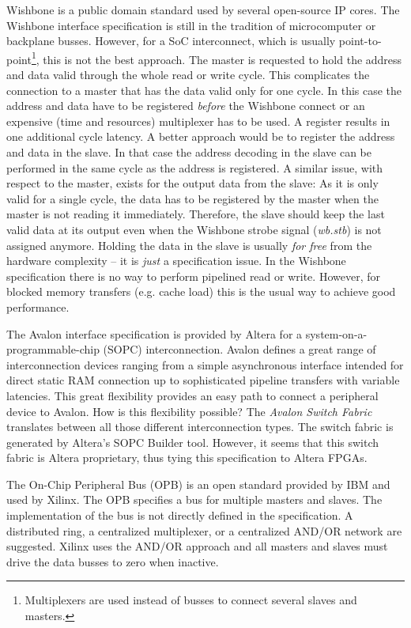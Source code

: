 Wishbone \cite{soc:wishbone} is a public domain standard used by
several open-source IP cores. The Wishbone interface specification is
still in the tradition of microcomputer or backplane busses. However,
for a SoC interconnect, which is usually
point-to-point\footnote{Multiplexers are used instead of busses to
connect several slaves and masters.}, this is not the best approach.
The master is requested to hold the address and data valid through
the whole read or write cycle. This complicates the connection to a
master that has the data valid only for one cycle. In this case the
address and data have to be registered \emph{before} the Wishbone
connect or an expensive (time and resources) multiplexer has to be
used. A register results in one additional cycle latency. A better
approach would be to register the address and data in the slave. In
that case the address decoding in the slave can be performed in the
same cycle as the address is registered. A similar issue, with
respect to the master, exists for the output data from the slave: As
it is only valid for a single cycle, the data has to be registered by
the master when the master is not reading it immediately. Therefore,
the slave should keep the last valid data at its output even when the
Wishbone strobe signal (\emph{wb.stb}) is not assigned anymore.
Holding the data in the slave is usually \emph{for free} from the
hardware complexity -- it is \emph{just} a specification issue. In
the Wishbone specification there is no way to perform pipelined read
or write. However, for blocked memory transfers (e.g. cache load)
this is the usual way to achieve good performance.


The Avalon \cite{soc:avalon} interface specification is provided by
Altera for a system-on-a-programmable-chip (SOPC) interconnection.
Avalon defines a great range of interconnection devices ranging from
a simple asynchronous interface intended for direct static RAM
connection up to sophisticated pipeline transfers with variable
latencies. This great flexibility provides an easy path to connect a
peripheral device to Avalon. How is this flexibility possible? The
\emph{Avalon Switch Fabric} translates between all those different
interconnection types. The switch fabric is generated by Altera's
SOPC Builder tool. However, it seems that this switch fabric is
Altera proprietary, thus tying this specification to Altera FPGAs.

The On-Chip Peripheral Bus (OPB) \cite{soc:opb} is an open standard
provided by IBM and used by Xilinx. The OPB specifies a bus for
multiple masters and slaves. The implementation of the bus is not
directly defined in the specification. A distributed ring, a
centralized multiplexer, or a centralized AND/OR network are
suggested. Xilinx uses the AND/OR approach and all masters and
slaves must drive the data busses to zero when inactive.



